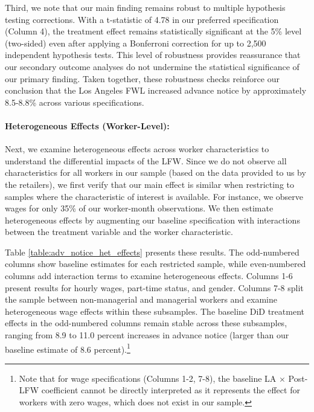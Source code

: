 \documentclass[letterpaper,11pt,leqno]{article}
\theoremstyle{paper}
\begin{document}
Third, we note that our main finding remains robust to multiple hypothesis testing corrections. With a t-statistic of 4.78 in our preferred specification (Column 4), the treatment effect remains statistically significant at the 5\% level (two-sided) even after applying a Bonferroni correction for up to 2,500 independent hypothesis tests. This level of robustness provides reassurance that our secondary outcome analyses do not undermine the statistical significance of our primary finding. Taken together, these robustness checks reinforce our conclusion that the Los Angeles FWL increased advance notice by approximately 8.5-8.8\% across various specifications.


\paragraph{Heterogeneous Effects (Worker-Level):}
Next, we examine heterogeneous effects across worker characteristics to understand the differential impacts of the LFW. Since we do not observe all characteristics for all workers in our sample (based on the data provided to us by the retailers), we first verify that our main effect is similar when restricting to samples where the characteristic of interest is available. For instance, we observe wages for only 35\% of our worker-month observations. We then estimate heterogeneous effects by augmenting our baseline specification with interactions between the treatment variable and the worker characteristic.

Table \ref{table:adv_notice_het_effects} presents these results. The odd-numbered columns show baseline estimates for each restricted sample, while even-numbered columns add interaction terms to examine heterogeneous effects. Columns 1-6 present results for hourly wages, part-time status, and gender. Columns 7-8 split the sample between non-managerial and managerial workers and examine heterogeneous wage effects within these subsamples. The baseline DiD treatment effects in the odd-numbered columns remain stable across these subsamples, ranging from 8.9 to 11.0 percent increases in advance notice (larger than our baseline estimate of 8.6 percent).\footnote{Note that for wage specifications (Columns 1-2, 7-8), the baseline LA $\times$ Post-LFW coefficient cannot be directly interpreted as it represents the effect for workers with zero wages, which does not exist in our sample.} 
\end{document}
